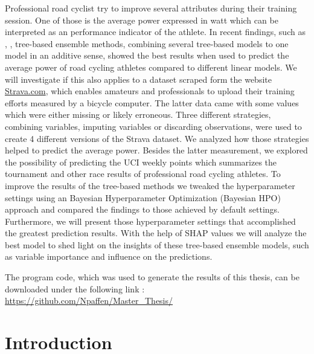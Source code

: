 \documentclass[12pt,a4paper]{article}
\begin{document}
Professional road cyclist try to improve several attributes during their training session. One of those is the average power expressed in watt which can be interpreted as an performance indicator of the athlete. In recent findings, such as \textcite{Karetnikov2019}, \textcite{Kholkine2020}, tree-based ensemble methods, combining several tree-based models to one model in an additive sense, showed the best results when used to predict the average power of road cycling athletes compared to different linear models. We will investigate if this also applies to a dataset scraped form the website \href{Strava.com}{Strava.com}, which enables amateurs and professionals to upload their training efforts measured by a bicycle computer. The latter data came with some values which were either missing or likely erroneous. Three different strategies, combining variables, imputing variables or discarding observations, were used to create 4 different versions of the Strava dataset. We analyzed how those strategies helped to predict the average power. Besides the latter measurement, we explored the possibility of predicting the UCI weekly points which summarizes the tournament and other race results of professional road cycling athletes. To improve the results of the tree-based methods we tweaked the hyperparameter settings using an Bayesian Hyperparameter Optimization (Bayesian HPO) approach and compared the findings to those achieved by default settings. Furthermore, we will present those hyperparameter settings that accomplished the greatest prediction results. With the help of SHAP values we will analyze the best model to shed light on the insights of these tree-based ensemble models, such as variable importance and influence on the predictions.

The program code, which was used to generate the results of this thesis, can be downloaded under the following link : \url{https://github.com/Npaffen/Master_Thesis/}
\pagebreak

\hypertarget{introduction}{%
\section{Introduction}\label{introduction}}
\end{document}
